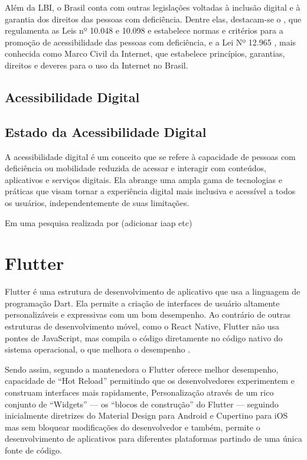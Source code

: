 Além da LBI, o Brasil conta com outras legislações voltadas à inclusão digital e à garantia dos direitos das pessoas com deficiência. Dentre elas, destacam-se o \cite{decreto5296}, que regulamenta as Leis nº 10.048 e 10.098 e estabelece normas e critérios para a promoção de acessibilidade das pessoas com deficiência, e a Lei Nº 12.965 \cite{lei12965}, mais conhecida como Marco Civil da Internet, que estabelece princípios, garantias, direitos e deveres para o uso da Internet no Brasil.

\subsection{Acessibilidade Digital}

\subsection{Estado da Acessibilidade Digital}

A acessibilidade digital é um conceito que se refere à capacidade de pessoas com deficiência ou mobilidade reduzida de acessar e interagir com conteúdos, aplicativos e serviços digitais. Ela abrange uma ampla gama de tecnologias e práticas que visam tornar a experiência digital mais inclusiva e acessível a todos os usuários, independentemente de suas limitações.

Em uma pesquisa realizada por (adicionar iaap etc)

\section{Flutter}

Flutter é uma estrutura de desenvolvimento de aplicativo que usa a linguagem de programação Dart. Ela permite a criação de interfaces de usuário altamente personalizáveis e expressivas com um bom desempenho. Ao contrário de outras estruturas de desenvolvimento móvel, como o React Native, Flutter não usa pontes de JavaScript, mas compila o código diretamente no código nativo do sistema operacional, o que melhora o desempenho \cite{flutter}.

Sendo assim, segundo a mantenedora o Flutter oferece melhor desempenho, capacidade de “Hot Reload” permitindo que os desenvolvedores experimentem e construam interfaces mais rapidamente, Personalização através de um rico conjunto de “Widgets” --- os “blocos de construção” do Flutter --- seguindo inicialmente diretrizes do Material Design para Android e Cupertino para iOS mas sem bloquear modificações do desenvolvedor e também, permite o desenvolvimento de aplicativos para diferentes plataformas partindo de uma única fonte de código.

